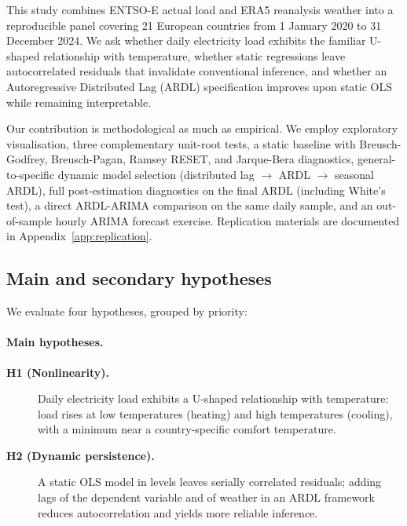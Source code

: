 \documentclass[12pt,a4paper]{article}
\begin{document}
\noindent This study combines ENTSO-E actual load and ERA5 reanalysis weather into a reproducible panel covering 21 European countries from 1 January 2020 to 31 December 2024. We ask whether daily electricity load exhibits the familiar U-shaped relationship with temperature, whether static regressions leave autocorrelated residuals that invalidate conventional inference, and whether an Autoregressive Distributed Lag (ARDL) specification improves upon static OLS while remaining interpretable.

\noindent Our contribution is methodological as much as empirical. We employ exploratory visualisation, three complementary unit-root tests, a static baseline with Breusch-Godfrey, Breusch-Pagan, Ramsey RESET, and Jarque-Bera diagnostics, general-to-specific dynamic model selection (distributed lag $\rightarrow$ ARDL $\rightarrow$ seasonal ARDL), full post-estimation diagnostics on the final ARDL (including White's test), a direct ARDL-ARIMA comparison on the same daily sample, and an out-of-sample hourly ARIMA forecast exercise. Replication materials are documented in Appendix~\ref{app:replication}.

\subsection{Main and secondary hypotheses}

We evaluate four hypotheses, grouped by priority:

\paragraph{Main hypotheses.}
\begin{description}
  \item[\textbf{H1 (Nonlinearity).}] Daily electricity load exhibits a U-shaped relationship with temperature: load rises at low temperatures (heating) and high temperatures (cooling), with a minimum near a country-specific comfort temperature.
  \item[\textbf{H2 (Dynamic persistence).}] A static OLS model in levels leaves serially correlated residuals; adding lags of the dependent variable and of weather in an ARDL framework reduces autocorrelation and yields more reliable inference.
\end{description}
\end{document}
